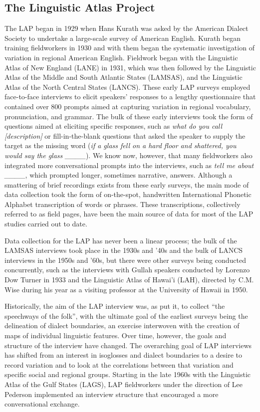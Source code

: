 \documentclass[output=paper]{langscibook}
\begin{document}
\subsection{The Linguistic Atlas Project} %
\label{sec:burkette:2.1}
\largerpage
The LAP began in 1929 when Hans Kurath was asked by the American Dialect Society to undertake a large-scale survey of American English. Kurath began training fieldworkers in 1930 and with them began the systematic investigation of variation in regional American English. Fieldwork began with the Linguistic Atlas of New England (LANE) in 1931, which was then followed by the Linguistic Atlas of the Middle and South Atlantic States (LAMSAS), and the Linguistic Atlas of the North Central States (LANCS). These early LAP surveys employed face-to-face interviews to elicit speakers’ responses to a lengthy questionnaire that contained over 800 prompts aimed at capturing variation in regional vocabulary, pronunciation, and grammar. The bulk of these early interviews took the form of questions aimed at eliciting specific responses, such as \textit{what do you call [description]} or fill-in-the-blank questions that asked the speaker to supply the target as the missing word (\textit{if a glass fell on a hard floor and shattered, you would say the glass \_\_\_\_}). We know now, however, that many fieldworkers also integrated more conversational prompts into the interviews, such as \textit{tell me about \_\_\_\_}, which prompted longer, sometimes narrative, answers. Although a smattering of brief recordings exists from these early surveys, the main mode of data collection took the form of on-the-spot, handwritten International Phonetic Alphabet transcription of words or phrases. These transcriptions, collectively referred to as field pages, have been the main source of data for most of the LAP studies carried out to date. 

Data collection for the LAP has never been a linear process; the bulk of the LAMSAS interviews took place in the 1930s and '40s and the bulk of LANCS interviews in the 1950s and '60s, but there were other surveys being conducted concurrently, such as the interviews with Gullah speakers conducted by Lorenzo Dow Turner in 1933 and the Linguistic Atlas of Hawai’i (LAH), directed by C.M. Wise during his year as a visiting professor at the University of Hawaii in 1950. 

Historically, the aim of the LAP interview was, as \citet[13]{Kurath1972} put it, to collect ``the speechways of the folk'', with the ultimate goal of the earliest surveys being the delineation of dialect boundaries, an exercise interwoven with the creation of maps of individual linguistic features. Over time, however, the goals and structure of the interview have changed. The overarching goal of LAP interviews has shifted from an interest in isoglosses and dialect boundaries to a desire to record variation and to look at the correlations between that variation and specific social and regional groups. Starting in the late 1960s with the Linguistic Atlas of the Gulf States (LAGS), LAP fieldworkers under the direction of Lee Pederson implemented an interview structure that encouraged a more conversational exchange.
\end{document}
